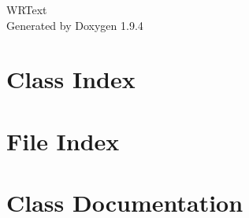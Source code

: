 \documentclass[twoside]{book}
\newcommand{\+}{\discretionary{\mbox{\scriptsize$\hookleftarrow$}}{}{}}
\newcommand{\clearemptydoublepage}{%
    \newpage{\pagestyle{empty}\cleardoublepage}%
  }
\begin{document}
  \raggedbottom
    \hypersetup{pageanchor=false,
                bookmarksnumbered=true,
                pdfencoding=unicode
               }
  \begin{titlepage}
  \vspace*{7cm}
  \begin{center}%
  {\Large WRText}\\
  \vspace*{1cm}
  {\large Generated by Doxygen 1.9.4}\\
  \end{center}
  \end{titlepage}
  \clearemptydoublepage
  \tableofcontents
  \clearemptydoublepage
  \hypersetup{pageanchor=true}
\chapter{Class Index}

\chapter{File Index}

\chapter{Class Documentation}








\end{document}
